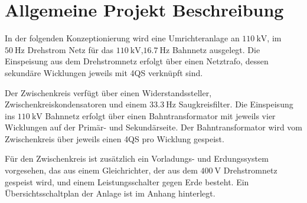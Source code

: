 \section{Allgemeine Projekt Beschreibung}
In der folgenden Konzeptionierung wird eine Umrichteranlage an $\SI{110}{\kV}$, im $\SI{50}{\Hz}$ Drehstrom Netz für das $\SI{110}{\kV}$,$\SI{16.7}{\Hz}$ Bahnnetz ausgelegt.
Die Einspeisung aus dem Drehstromnetz erfolgt über einen Netztrafo, dessen sekundäre Wicklungen jeweils mit \gls{4QS} verknüpft sind. 

Der Zwischenkreis verfügt über einen Widerstandssteller, Zwischenkreiskondensatoren und einem $\SI{33.3}{\Hz}$ Saugkreisfilter. 
Die Einspeisung ins $\SI{110}{\kV}$ Bahnnetz erfolgt über einen Bahntransformator mit jeweils vier Wicklungen auf der Primär- und Sekundärseite. 
Der Bahntransformator wird vom Zwischenkreis über jeweils einen \gls{4QS} pro Wicklung gespeist. 

Für den Zwischenkreis ist zusätzlich ein Vorladungs- und Erdungssystem vorgesehen, das aus einem Gleichrichter, der aus dem $\SI{400}{\V}$ Drehstromnetz gespeist wird, und einem Leistungsschalter gegen Erde besteht.
Ein Übersichtsschaltplan der Anlage ist im Anhang hinterlegt.
